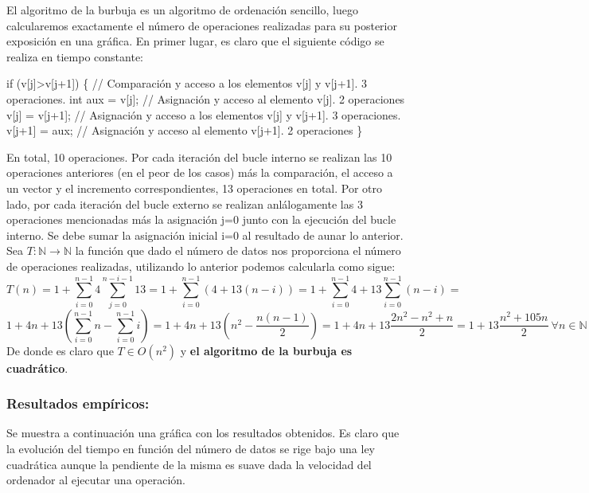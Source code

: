 \documentclass[]{article}
\newenvironment{Shaded}{\begin{snugshade}}{\end{snugshade}}
\newcommand{\KeywordTok}[1]{\textcolor[rgb]{0.94,0.87,0.69}{{#1}}}
\newcommand{\DataTypeTok}[1]{\textcolor[rgb]{0.87,0.87,0.75}{{#1}}}
\newcommand{\DecValTok}[1]{\textcolor[rgb]{0.86,0.86,0.80}{{#1}}}
\newcommand{\CommentTok}[1]{\textcolor[rgb]{0.50,0.62,0.50}{{#1}}}
\newcommand{\NormalTok}[1]{\textcolor[rgb]{0.80,0.80,0.80}{{#1}}}
\begin{document}
El algoritmo de la burbuja es un algoritmo de ordenación sencillo, luego
calcularemos exactamente el número de operaciones realizadas para su
posterior exposición en una gráfica. En primer lugar, es claro que el
siguiente código se realiza en tiempo constante:

\begin{Shaded}
\begin{Highlighting}[]
\KeywordTok{if} \NormalTok{(v[j]>v[j}\DecValTok{+1}\NormalTok{]) \{ }\CommentTok{// Comparación y acceso a los elementos v[j] y v[j+1]. 3 operaciones.}
    \DataTypeTok{int} \NormalTok{aux = v[j]; }\CommentTok{// Asignación y acceso al elemento v[j]. 2 operaciones}
    \NormalTok{v[j] = v[j}\DecValTok{+1}\NormalTok{]; }\CommentTok{// Asignación y acceso a los elementos v[j] y v[j+1]. 3 operaciones.}
    \NormalTok{v[j}\DecValTok{+1}\NormalTok{] = aux; }\CommentTok{// Asignación y acceso al elemento v[j+1]. 2 operaciones}
\NormalTok{\}}
\end{Highlighting}
\end{Shaded}

En total, 10 operaciones. Por cada iteración del bucle interno se
realizan las 10 operaciones anteriores (en el peor de los casos) más la
comparación, el acceso a un vector y el incremento correspondientes, 13
operaciones en total. Por otro lado, por cada iteración del bucle
externo se realizan anlálogamente las 3 operaciones mencionadas más la
asignación j=0 junto con la ejecución del bucle interno. Se debe sumar
la asignación inicial i=0 al resultado de aunar lo anterior. Sea
\(T: \mathbb{N} \rightarrow \mathbb{N}\) la función que dado el número
de datos nos proporciona el número de operaciones realizadas, utilizando
lo anterior podemos calcularla como sigue:
\[ T(n) = 1 + \sum_{i=0}^{n-1}4\sum_{j=0}^{n-i-1}13 = 1 + \sum_{i=0}^{n-1}(4+13(n-i)) = 1 + \sum_{i=0}^{n-1}4 + 13\sum_{i=0}^{n-1}(n-i)= \]
\[ 1 + 4n + 1   3\left(\sum_{i=0}^{n-1}n - \sum_{i=0}^{n-1}i\right) = 1 + 4n + 13(n^2 - \frac{n(n-1)}{2}) = 1 + 4n + 13\frac{2n^2 - n^2 + n}{2} = 1  + 13\frac{n^2 + 105n}{2} \ \forall n \in \mathbb{N} \]
De donde es claro que \(T \in O(n^2)\) y \textbf{el algoritmo de la
burbuja es cuadrático}.

\subsubsection{Resultados empíricos:}\label{resultados-empiricos}

Se muestra a continuación una gráfica con los resultados obtenidos. Es
claro que la evolución del tiempo en función del número de datos se rige
bajo una ley cuadrática aunque la pendiente de la misma es suave dada la
velocidad del ordenador al ejecutar una operación.
\end{document}
